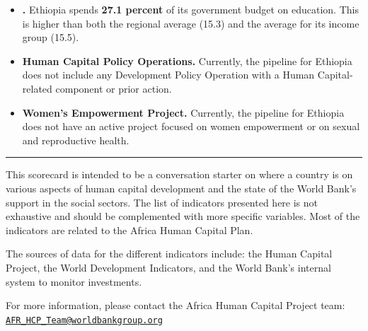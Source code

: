 \documentclass[9.2pt,twocolumn]{article}
\begin{document}
\begin{itemize}
\item
  \textbf{.} Ethiopia spends \textbf{27.1 percent} of its government
  budget on education. This is higher than both the regional average
  (15.3) and the average for its income group (15.5).
\item
  \textbf{Human Capital Policy Operations.} Currently, the pipeline for
  Ethiopia does not include any Development Policy Operation with a
  Human Capital-related component or prior action.
\item
  \textbf{Women's Empowerment Project.} Currently, the pipeline for
  Ethiopia does not have an active project focused on women empowerment
  or on sexual and reproductive health.
\end{itemize}

\noindent

\rule{9cm}{0.4pt}

This scorecard is intended to be a conversation starter on where a
country is on various aspects of human capital development and the state
of the World Bank's support in the social sectors. The list of
indicators presented here is not exhaustive and should be complemented
with more specific variables. Most of the indicators are related to the
Africa Human Capital Plan. ~

The sources of data for the different indicators include: the Human
Capital Project, the World Development Indicators, and the World Bank's
internal system to monitor investments. ~

For more information, please contact the Africa Human Capital Project
team:
\href{mailto:AFR_HCP_Team@worldbankgroup.org}{\nolinkurl{AFR\_HCP\_Team@worldbankgroup.org}}
\end{document}
